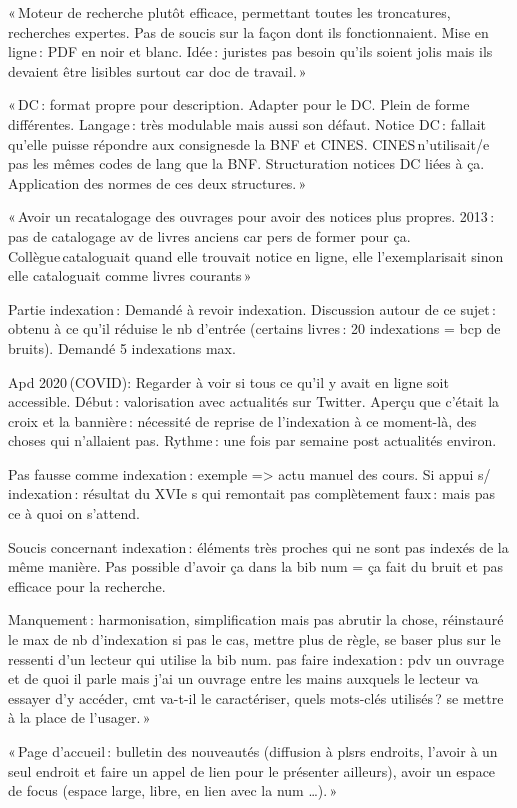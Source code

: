 « Moteur de recherche plutôt efficace, permettant toutes les troncatures, recherches expertes. Pas de soucis sur la façon dont ils fonctionnaient. Mise en ligne : PDF en noir et blanc. Idée : juristes pas besoin qu’ils soient jolis mais ils devaient être lisibles surtout car doc de travail. » 

« DC : format propre pour description. Adapter pour le DC. Plein de forme différentes. Langage : très modulable mais aussi son défaut. Notice DC : fallait qu’elle puisse répondre aux consignesde la BNF et CINES. CINES n’utilisait/e pas les mêmes codes de lang que la BNF. Structuration notices DC liées à ça. Application des normes de ces deux structures. » 

« Avoir un recatalogage des ouvrages pour avoir des notices plus propres. 2013 : pas de catalogage av de livres anciens car pers de former pour ça. Collègue cataloguait quand elle trouvait notice en ligne, elle l’exemplarisait sinon elle cataloguait comme livres courants » 

Partie indexation : Demandé à revoir indexation. Discussion autour de ce sujet : obtenu à ce qu’il réduise le nb d’entrée (certains livres : 20 indexations = bcp de bruits). Demandé 5 indexations max.  

Apd 2020 (COVID): Regarder à voir si tous ce qu’il y avait en ligne soit accessible. Début : valorisation avec actualités sur Twitter. Aperçu que c’était la croix et la bannière : nécessité de reprise de l’indexation à ce moment-là, des choses qui n’allaient pas. Rythme : une fois par semaine post actualités environ. 

Pas fausse comme indexation : exemple => actu manuel des cours. Si appui s/ indexation : résultat du XVIe s qui remontait pas complètement faux : mais pas ce à quoi on s’attend. 

Soucis concernant indexation : éléments très proches qui ne sont pas indexés de la même manière. Pas possible d’avoir ça dans la bib num = ça fait du bruit et pas efficace pour la recherche.  

Manquement : harmonisation, simplification mais pas abrutir la chose, réinstauré le max de nb d’indexation si pas le cas, mettre plus de règle, se baser plus sur le ressenti d’un lecteur qui utilise la bib num. pas faire indexation : pdv un ouvrage et de quoi il parle mais j’ai un ouvrage entre les mains auxquels le lecteur va essayer d’y accéder, cmt va-t-il le caractériser, quels mots-clés utilisés ? se mettre à la place de l’usager. » 

« Page d’accueil : bulletin des nouveautés (diffusion à plsrs endroits, l’avoir à un seul endroit et faire un appel de lien pour le présenter ailleurs), avoir un espace de focus (espace large, libre, en lien avec la num …). » 



